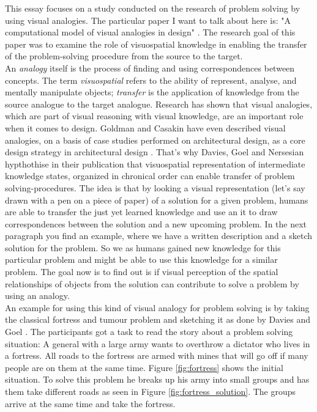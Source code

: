 \documentclass[12pt]{article}
\begin{document}
\noindent This essay focuses on a study conducted on the research of problem solving by using visual analogies. The particular paper I want to talk about here is: "A computational model of visual analogies in design" \cite{davies2009computational}. The research goal of this paper was to examine the role of visuospatial knowledge in enabling
the transfer of the problem-solving procedure from the source to the target. \\
\indent An \textit{analogy} itself is the process of finding and using correspondences between concepts. The term \textit{visuospatial} refers to the ability of represent, analyse, and mentally manipulate objects; \textit{transfer} is the application of knowledge from the source analogue to the target analogue. Research has shown that visual analogies, which are part of visual reasoning with visual knowledge, are an important role when it comes to design. Goldman and Casakin have even described visual analogies, on a basis of case studies performed on architectural design, as a core design strategy in architectural design \cite{casakin1999expertise}. That's why Davies, Goel and Nersesian hypthothise in their publication that visuospatial representation of intermediate knowledge states, organized in chronical order can enable transfer of problem solving-procedures. The idea is that by looking a visual representation (let's say drawn with a pen on a piece of paper) of a solution for a given problem, humans are able to transfer the just yet learned knowledge and use an it to draw correspondences between the solution and a new upcoming problem. In the next paragraph you find an example, where we have a written description and a sketch solution for the problem. So we as humans gained new knowledge for this particular problem and might be able to use this knowledge for a similar problem. The goal now is to find out is if visual perception of the spatial relationships of objects from the solution can contribute to solve a 
problem by using an analogy. \\
\indent An example for using this kind of visual analogy for problem solving is by taking the classical fortress and tumour problem \cite{duncker1926qualitative} and sketching it as done by Davies and Goel \cite{davies2001visual}. The participants got a task to read the story about a problem solving situation: A general with a large army wants to overthrow a dictator who lives in a fortress. All roads to the fortress are armed with mines that will go off if many people are on them at the same time. Figure \ref{fig:fortress} shows the initial situation. To solve this problem he breaks up his army into small groups and has them take different roads as seen in Figure \ref{fig:fortress_solution}. The groups arrive at the same time and take the fortress.  
\end{document}
